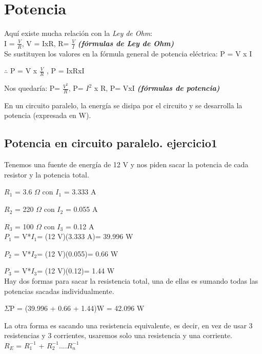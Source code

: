 \documentclass[a4paper,11pt]{article}
\begin{document}
\section{Potencia}
\noindent Aquí existe mucha relación con la \textit{Ley de Ohm}:
\vspace{0.2cm}\\
I = $\frac{V}{R}$, V = IxR, R= $\frac{V}{I}$ \textcolor[cmyk]{1,0,1,0}{\textbf{\textit{(fórmulas de Ley de Ohm)}}}
\vspace{0.2cm}\\
\noindent Se sustituyen los valores en la fórmula general de potencia eléctrica: P = V x I

$\therefore$ P = V x $\frac{V}{R}$ , P = IxRxI 
\begin{center}
    Nos quedaría: P= $\frac{V^2}{R}$, P= $I^2$ x R, P= VxI \textcolor[cmyk]{1,0,1,0}{\textbf{\textit{(fórmulas de potencia)}}}
\end{center} 
\noindent En un circuito paralelo, la energía se disipa por el circuito y se desarrolla la potencia (expresada en W).

\subsection{Potencia en circuito paralelo. ejercicio1}
\noindent Tenemos una fuente de energía de 12 V y nos piden sacar la potencia de cada resistor y la potencia total.

$R_1$ = 3.6 $\Omega$ con $I_1$ = 3.333 A

$R_2$ = 220 $\Omega$ con $I_2$ = 0.055 A

$R_3$ = 100 $\Omega$ con $I_3$ = 0.12 A
\vspace{0.5cm}\\
$P_1$ = V*$I_1$= (12 V)(3.333 A)= 39.996 W

$P_2$ = V*$I_2$= (12 V)(0.055)= 0.66 W

$P_3$ = V*$I_3$= (12 V)(0.12)= 1.44 W
\vspace{0.5cm}\\
Hay dos formas para sacar la resistencia total, una de ellas es sumando todas las potencias sacadas individualmente.

\begin{center}
    $\Sigma$P = (39.996 + 0.66 + 1.44)W = 42.096 W
\end{center}
La otra forma es sacando una resistencia equivalente, es decir, en vez de usar 3 resistencias y 3 corrientes, usaremos solo una resistencia y una corriente.
\vspace{0.5cm}\\
$R_E$ = $R_1^{-1}$ + $R_2^{-1}$....$R_n^{-1}$
\end{document}
